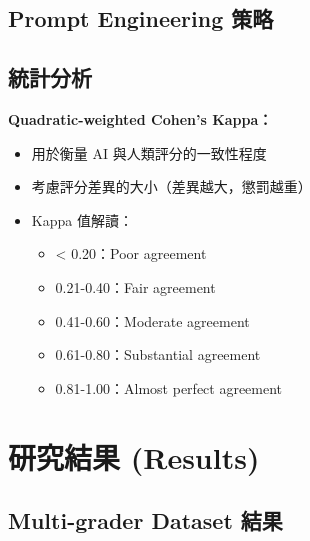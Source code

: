\documentclass[12pt,a4paper]{article}
\begin{document}
\subsection{Prompt Engineering 策略}


\subsection{統計分析}

\textbf{Quadratic-weighted Cohen's Kappa：}
\begin{itemize}[leftmargin=2em]
    \item 用於衡量 AI 與人類評分的一致性程度
    \item 考慮評分差異的大小（差異越大，懲罰越重）
    \item Kappa 值解讀：
    \begin{itemize}
        \item < 0.20：Poor agreement
        \item 0.21-0.40：Fair agreement
        \item 0.41-0.60：Moderate agreement
        \item 0.61-0.80：Substantial agreement
        \item 0.81-1.00：Almost perfect agreement
    \end{itemize}
\end{itemize}

\section{研究結果 (Results)}

\subsection{Multi-grader Dataset 結果}
\end{document}
